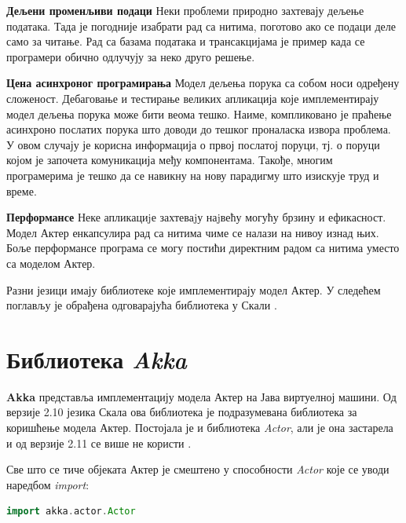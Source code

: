 \documentclass[12pt,oneside]{memoir}
\begin{document}
\begin{description}
\item \textbf{Дељени променљиви подаци} Неки проблеми природно захтевају дељење података. Тада је погодније изабрати рад са нитима, поготово ако се подаци деле само за читање. Рад са базама података и трансакцијама је пример када се програмери обично одлучују за неко друго решење.
\item \textbf{Цена асинхроног програмирања} Модел дељења порука са собом носи одређену сложеност. Дебаговање и тестирање великих апликација које имплементирају модел дељења порука може бити веома тешко. Наиме, компликовано је праћење асинхроно послатих порука што доводи до тешког проналаска извора проблема. У овом случају је корисна информација о првој послатој поруци, тј. о поруци којом је започета комуникација међу компонентама. Такође, многим програмерима је тешко да се навикну на нову парадигму што изискује труд и време.
\item \textbf{Перформансе} Неке апликациjе захтеваjу наjвећу могућу брзину и ефикасност. Модел Актер енкапсулира рад са нитима чиме се налази на нивоу изнад њих. Боље перформансе програма се могу постићи директним радом са нитима уместо са моделом Актер.
\end{description}

Разни језици имају библиотеке које имплементирају модел Актер. У следећем поглављу је обрађена одговарајућа библиотека у Скали \cite{progInScala3, carlHewittActor, seven}.

\section{Библиотека \textit{Akka}}
\label{sec:akka}

\textbf{Akka} представља имплементацију модела Актер на Јава виртуелној машини. Од верзије 2.10 језика Скала ова библиотека је подразумевана библиотека за коришћење модела Актер. Постојала је и библиотека \textit{Actor}, али је она застарела и од верзије 2.11 се више не користи \cite{akkaMarius}.

Све што се тиче објеката Актер је смештено у способности \textit{Actor} које се уводи наредбом \textit{import}:
\begin{lstlisting}[language=Scala]
import akka.actor.Actor
\end{lstlisting}
\end{document}
